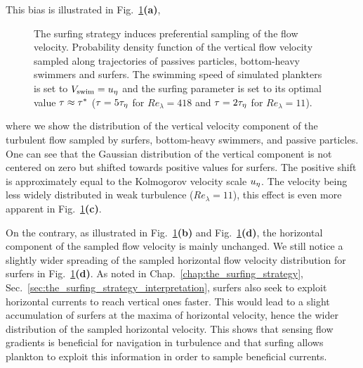 This bias is illustrated in Fig.~\ref{fig:surfing_velocity_sampled}\textbf{(a)}, 
\begin{figure}[t]
	\centering
	
	\caption[The surfing strategy induces preferential sampling of the flow velocity.]{
		The surfing strategy induces preferential sampling of the flow velocity.
		Probability density function of the vertical flow velocity sampled along trajectories of passives particles, bottom-heavy swimmers and surfers. 
		The swimming speed of simulated plankters is set to $V_{\mathrm{swim}} = u_{\eta}$ and the surfing parameter is set to its optimal value $\tau \approx \tau^*$ ($\tau = 5 \tau_{\eta}$ for $\mathit{Re}_{\lambda} = 418$ and $\tau = 2 \tau_{\eta}$ for $\mathit{Re}_{\lambda} = 11$).
	}
	\label{fig:surfing_velocity_sampled}
\end{figure}
where we show the distribution of the vertical velocity component of the turbulent flow sampled by surfers, bottom-heavy swimmers, and passive particles.
One can see that the Gaussian distribution of the vertical component is not centered on zero but shifted towards positive values for surfers.
The positive shift is approximately equal to the Kolmogorov velocity scale $u_{\eta}$.
The velocity being less widely distributed in weak turbulence ($\mathit{Re}_{\lambda} = 11$), this effect is even more apparent in Fig.~\ref{fig:surfing_velocity_sampled}\textbf{(c)}.

On the contrary, as illustrated in Fig.~\ref{fig:surfing_velocity_sampled}\textbf{(b)} and Fig.~\ref{fig:surfing_velocity_sampled}\textbf{(d)}, the horizontal component of the sampled flow velocity is mainly unchanged.
We still notice a slightly wider spreading of the sampled horizontal flow velocity distribution for surfers in Fig.~\ref{fig:surfing_velocity_sampled}\textbf{(d)}.
As noted in Chap.~\ref{chap:the_surfing_strategy}, Sec.~\ref{sec:the_surfing_strategy_interpretation}, surfers also seek to exploit horizontal currents to reach vertical ones faster.
This would lead to a slight accumulation of surfers at the maxima of horizontal velocity, hence the wider distribution of the sampled horizontal velocity.
This shows that sensing flow gradients is beneficial for navigation in turbulence and that surfing allows plankton to exploit this information in order to sample beneficial currents.

